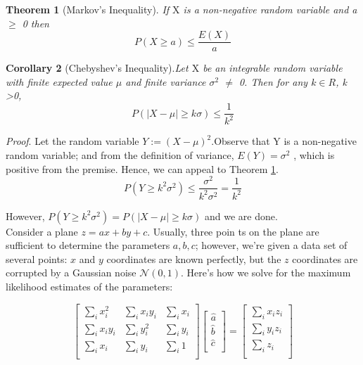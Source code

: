 \documentclass[10pt, A4]{article}
\begin{document}
\textbf{Theorem 1}\label{theorem1} (Markov’s Inequality). \textit{If $\text{X}$ is a non-negative random variable and a $\ge$ 0 then}
$$P(X \ge a) \le \frac{E(X)}{a}$$

\textbf{Corollary 2}\label{corollary2} (Chebyshev’s Inequality).\textit{Let $\text{X}$ be an integrable random variable with finite expected
	value $\mu$ and finite variance  $\sigma^2$ $\ne$ 0. Then for any $k \in R$, k \textgreater 0,}
$$P( \lvert X-\mu\rvert \ge k\sigma) \le \frac{1}{k^2}$$

\textit{Proof}. Let the random variable $Y :=(X- \mu)^2$.Observe that Y is a non-negative random variable;
and from the definition of variance, $E(Y ) = \sigma^2$ , which is positive from the premise. Hence, we
can appeal to Theorem \hyperref[theorem1]{1}.
$$P(Y \ge k^2 \sigma^2) \le \frac{\sigma^2}{k^2\sigma^2} = \frac{1}{k^2}$$

However, $P (Y \ge k^2\sigma^2 ) = P (\lvert X-\mu \rvert \ge k\sigma)$ and we are done.\\

\vspace{0.8em}
Consider a plane $z = ax + by + c$. Usually, three poin ts on the plane are sufficient to determine
the parameters $a, b, c$; however, we’re given a data set of several points: $x$ and $y$ coordinates are
known perfectly, but the $z$ coordinates are corrupted by a Gaussian noise $\mathcal{N}(0, 1)$. Here’s how we
solve for the maximum likelihood estimates of the parameters:

\begin{equation}
	\label{equation1}
\begin{bmatrix}
	\sum_{i} x_{i}^2 & \sum_{i} x_{i}y_{i} & \sum_{i} x_{i}\\
	\sum_{i} x_{i}y_{i} & \sum_{i} y_{i}^2 & \sum_{i} y_{i}\\
	\sum_{i} x_{i} & \sum_{i} y_{i} & \sum_{i} 1\\ 
\end{bmatrix}
\begin{bmatrix}
	\hat a\\
	\hat b\\
	\hat c\\
\end{bmatrix}
=
\begin{bmatrix}
	\sum_{i} x_{i}z_{i}\\
	\sum_{i} y_{i}z_{i}\\
	\sum_{i} z_{i}\\
\end{bmatrix}
\end{equation}
\end{document}
